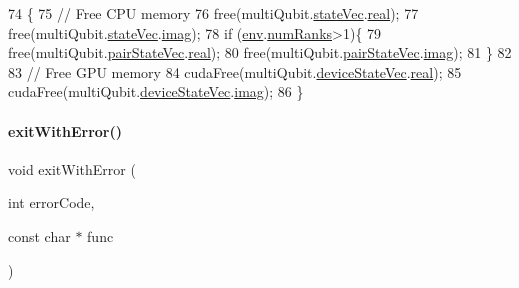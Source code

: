 \begin{DoxyCode}
74 \{
75     \textcolor{comment}{// Free CPU memory}
76     free(multiQubit.\mbox{\hyperlink{structMultiQubit_a45483190d6b01ef6b2f98f2bec9ab94f}{stateVec}}.\mbox{\hyperlink{structComplexArray_a4195cac6c784ea1b6271f1c7dba1548a}{real}});
77     free(multiQubit.\mbox{\hyperlink{structMultiQubit_a45483190d6b01ef6b2f98f2bec9ab94f}{stateVec}}.\mbox{\hyperlink{structComplexArray_a79dde47c7ae530c79cebfdf57b225968}{imag}});
78     \textcolor{keywordflow}{if} (\mbox{\hyperlink{runTests_8c_a5fd8ba97fcae3408ae6221dfc3cc1f93}{env}}.\mbox{\hyperlink{structQuESTEnv_af22aacd7c9905accae28484785c193b4}{numRanks}}>1)\{
79         free(multiQubit.\mbox{\hyperlink{structMultiQubit_a76f7db4eab52d2b30f58f973ada809c5}{pairStateVec}}.\mbox{\hyperlink{structComplexArray_a4195cac6c784ea1b6271f1c7dba1548a}{real}});
80         free(multiQubit.\mbox{\hyperlink{structMultiQubit_a76f7db4eab52d2b30f58f973ada809c5}{pairStateVec}}.\mbox{\hyperlink{structComplexArray_a79dde47c7ae530c79cebfdf57b225968}{imag}});
81     \}
82 
83     \textcolor{comment}{// Free GPU memory}
84     cudaFree(multiQubit.\mbox{\hyperlink{structMultiQubit_a59ac613486a41b8c9a4b6e79cc8d2cc3}{deviceStateVec}}.\mbox{\hyperlink{structComplexArray_a4195cac6c784ea1b6271f1c7dba1548a}{real}});
85     cudaFree(multiQubit.\mbox{\hyperlink{structMultiQubit_a59ac613486a41b8c9a4b6e79cc8d2cc3}{deviceStateVec}}.\mbox{\hyperlink{structComplexArray_a79dde47c7ae530c79cebfdf57b225968}{imag}});
86 \}
\end{DoxyCode}
\mbox{\label{QuEST__env__localGPU_8cu_ae5f9019826f35e8b51b1716cfe397b45}} 
\paragraph{\texorpdfstring{exit\+With\+Error()}{exitWithError()}}
{\footnotesize\ttfamily void exit\+With\+Error (\begin{DoxyParamCaption}\item[{int}]{error\+Code,  }\item[{const char $\ast$}]{func }\end{DoxyParamCaption})}



